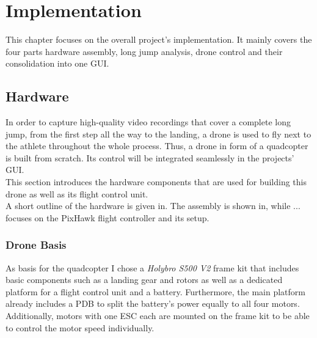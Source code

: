 \graphicspath{{./figures/}}
\chapter{Implementation}
This chapter focuses on the overall project's implementation.
It mainly covers the four parts hardware assembly, long jump analysis,
drone control and their consolidation into one \ac{GUI}.

\section{Hardware}\label{sec:4_hardware}
In order to capture high-quality video recordings that cover a complete long 
jump, from the first step all the way to the landing, a drone is used to fly
next to the athlete throughout the whole process.
Thus, a drone in form of a quadcopter is built from scratch.
Its control will be integrated seamlessly in the projects' \ac{GUI}.\\
This section introduces the hardware components that are used for building 
this drone as well as its flight control unit.\\
A short outline of the hardware is given in.
The assembly is shown in, while ... focuses on the PixHawk flight 
controller and its setup.

\subsection{Drone Basis}\label{subsec:4_drone_basis}
As basis for the quadcopter I chose a \textit{Holybro S500 V2} frame kit that 
includes basic components such as a landing gear and rotors as well as a 
dedicated platform for a flight control unit and a battery.
Furthermore, the main platform already includes a \ac{PDB} to split the 
battery's power equally to all four motors.
Additionally, motors with one \ac{ESC} each are mounted on the frame kit to be
able to control the motor speed individually.   